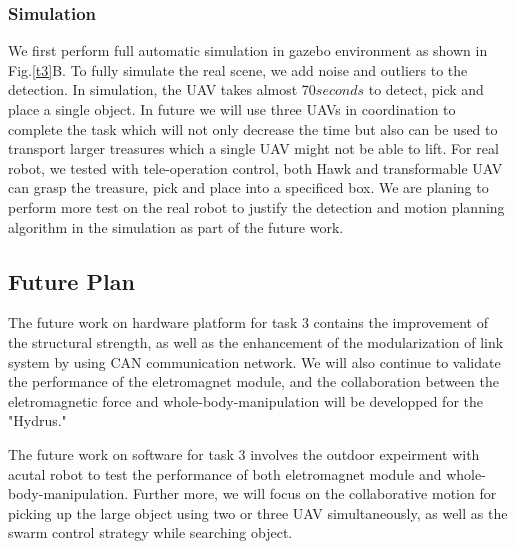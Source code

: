\documentclass{standalone}
\begin{document}
\subsubsection{Simulation}
We first perform full automatic simulation in gazebo environment as shown in Fig.\ref{t3}B. To fully simulate the real scene, we add noise and outliers to the detection. In simulation, the UAV takes almost 70$seconds$ to detect, pick and place a single object. In future we will use three UAVs in coordination to complete the task which will not only decrease the time but also can be used to transport larger treasures which a single UAV might not be able to lift.
For real robot, we tested with tele-operation control, both Hawk and transformable UAV can grasp the treasure, pick and place into a specificed box. We are planing to perform more test on the real robot to justify the detection and motion planning algorithm in the simulation as part of the future work.


\subsection{Future Plan}
The future work on hardware platform for task 3 contains the improvement of the structural strength, as well as the enhancement of the modularization of link system by using CAN communication network. We will also continue to validate the performance of the eletromagnet module, and the  collaboration between the eletromagnetic force and whole-body-manipulation will be developped for the "Hydrus."

The future work on software for task 3 involves the outdoor expeirment with acutal robot to test the performance of both eletromagnet module and whole-body-manipulation. Further more, we will focus on the collaborative motion for picking up the large object using two or three UAV simultaneously, as well as the swarm control strategy while searching object.
\end{document}
